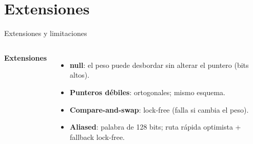 \documentclass[aspectratio=169,11pt,xcolor=table]{beamer}
\begin{document}
\section{Extensiones}
\begin{frame}{Extensiones y limitaciones}
  \begin{columns}[T]
    \textbf{Extensiones}
    \begin{itemize}
      \item<1-> \textbf{null}: el peso puede desbordar sin alterar el puntero (bits altos).
      \item<2-> \textbf{Punteros débiles}: ortogonales; mismo esquema.
      \item<3-> \textbf{Compare-and-swap}: lock-free (falla si cambia el peso).
      \item<4-> \textbf{Aliased}: palabra de 128 bits; ruta rápida optimista + fallback lock-free.
    \end{itemize}
  \end{columns}
\end{frame}

\end{document}
